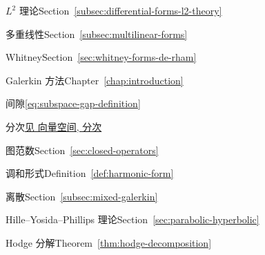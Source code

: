 \begin{theindex}
\subsubitem {}\label{index:form-differential-l-2-theory}{$L^2$ 理论}\quad Section~\ref{subsec:differential-forms-l2-theory}

\subitem {}\label{index:form-multilinear}{多重线性}\quad Section~\ref{subsec:multilinear-forms}

\subitem {}\label{index:form-whitney}{Whitney}\quad Section~\ref{sec:whitney-forms-de-rham}

\item {}\label{index:galerkin-method}{Galerkin 方法}\quad Chapter~\ref{chap:introduction}

\item {}\label{index:gap}{间隙}\quad \eqref{eq:subspace-gap-definition}

\item {}\label{index:grading}{分次}\quad \hyperref[index:vector-space-graded]{{见 向量空间, 分次}}

\item {}\label{index:graph-norm}{图范数}\quad Section~\ref{sec:closed-operators}

\item {}\label{index:harmonic-form}{调和形式}\quad Definition~\ref{def:harmonic-form}

\subitem {}\label{index:harmonic-form-discrete}{离散}\quad Section~\ref{subsec:mixed-galerkin}

\item {}\label{index:hille-yosida-phillips-theory}{Hille–Yosida–Phillips 理论}\quad Section~\ref{sec:parabolic-hyperbolic}

\item {}\label{index:hodge-decomposition}{Hodge 分解}\quad Theorem~\ref{thm:hodge-decomposition}


\end{theindex}
